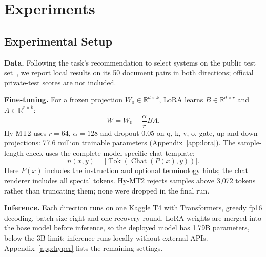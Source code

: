 \documentclass[11pt]{article}
\begin{document}
\section{Experiments}\label{sec:experiments}
\subsection{Experimental Setup}
\textbf{Data.} Following the task's recommendation to select systems on the public test set~\cite{vlsp2026}, we report local results on its 50 document pairs in both directions; official private-test scores are not included.

\textbf{Fine-tuning.} For a frozen projection $W_0\in\mathbb{R}^{d\times k}$, LoRA learns $B\in\mathbb{R}^{d\times r}$ and $A\in\mathbb{R}^{r\times k}$:
\begin{equation}
W=W_0+\frac{\alpha}{r}BA.
\label{eq:lora}
\end{equation}
Hy-MT2 uses $r=64$, $\alpha=128$ and dropout 0.05 on q, k, v, o, gate, up and down projections: 77.6 million trainable parameters (Appendix~\ref{app:lora}). The sample-length check uses the complete model-specific chat template:
\begin{equation}
n(x,y)=\big|\operatorname{Tok}(\operatorname{Chat}(P(x),y))\big|.
\label{eq:len}
\end{equation}
Here $P(x)$ includes the instruction and optional terminology hints; the chat renderer includes all special tokens. Hy-MT2 rejects samples above 3,072 tokens rather than truncating them; none were dropped in the final run.

\textbf{Inference.} Each direction runs on one Kaggle T4 with Transformers, greedy fp16 decoding, batch size eight and one recovery round. LoRA weights are merged into the base model before inference, so the deployed model has 1.79B parameters, below the 3B limit; inference runs locally without external APIs. Appendix~\ref{app:hyper} lists the remaining settings.
\end{document}
